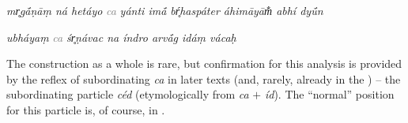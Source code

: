 \documentclass[output=paper,
modfonts
]{LSP/langsci}
\begin{document}
\begin{exe}
	\ex
	\begin{xlist}
		\ex
{\ob} \textit{mr̥gā́ṇāṃ ná hetáyo}{\cb} {\ob} {\textcolor{gray}{\textit{ca}}} {\ob}\textit{yánti  imā́ bŕ̥haspáter áhimāyām̐ abhí dyū́n}{\cb}{\cb}
\vspace{.11in}

\ex
{\ob} \textit{ubháyaṃ}{\cb} {\ob} {\textcolor{gray}{\textit{ca}}} {\ob}\textit{śr̥ṇávac  na índro arvā́g idáṃ vácaḥ}{\cb}{\cb} 
\end{xlist}
\end{exe}

The construction as a whole is rare, but confirmation for this analysis is provided by the reflex of subordinating
\textit{ca} in later  texts (and, rarely, already in the ) -- the subordinating particle \textit{céd} (etymologically from \textit{ca} $+$ 
\textit{íd}). The ``normal''
position for this particle is, of course, in .

\end{document}
